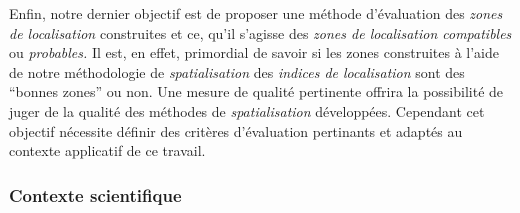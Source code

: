 
Enfin, notre dernier objectif est de proposer une méthode d'évaluation
des \emph{zones de localisation} construites et ce, qu'il s'agisse des
\emph{zones de localisation compatibles} ou \emph{probables.} Il est,
en effet, primordial de savoir si les zones construites à l'aide de
notre méthodologie de \emph{spatialisation} des \emph{indices de
  localisation} sont des \enquote{bonnes zones} ou non. Une mesure de
qualité pertinente offrira la possibilité de juger de la qualité des
méthodes de \emph{spatialisation} développées. Cependant cet objectif
nécessite définir des critères d'évaluation pertinants et adaptés au
contexte applicatif de ce travail.

\subsubsection{Contexte scientifique}

